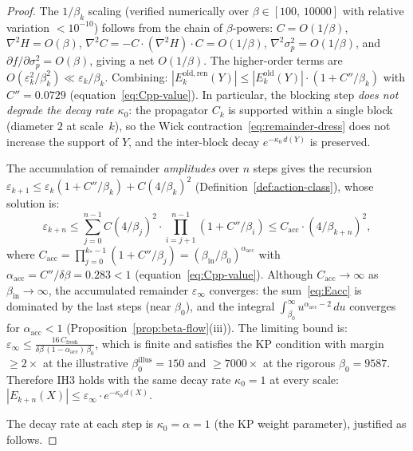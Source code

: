 \documentclass[11pt]{article}
\theoremstyle{definition}
\begin{document}
\begin{proof}
The $1/\beta_k$ scaling (verified numerically over
$\beta\in[100,\,10000]$ with relative variation $<10^{-10}$)
follows from the chain of
$\beta$-powers: $C=O(1/\beta)$, $\nabla^2 H=O(\beta)$,
$\nabla^2 C = -C\cdot(\nabla^2 H)\cdot C=O(1/\beta)$,
$\nabla^2\sigma_p^2=O(1/\beta)$, and $\partial f/\partial\sigma_p^2
=O(\beta)$, giving a net $O(1/\beta)$.
The higher-order terms are $O(\varepsilon_k^2/\beta_k^2)\ll
\varepsilon_k/\beta_k$.  Combining:
$|E_k^{\mathrm{old,ren}}(Y)|\le|E_k^{\mathrm{old}}(Y)|
\cdot(1+C''/\beta_k)$
with $C''=0.0729$
(equation~\eqref{eq:Cpp-value}).
In particular, the blocking step \emph{does not degrade the
decay rate $\kappa_0$}: the propagator $C_k$ is supported
within a single block (diameter $2$ at scale~$k$), so the
Wick contraction~\eqref{eq:remainder-dress} does not increase
the support of $Y$, and the inter-block decay
$e^{-\kappa_0\,d(Y)}$ is preserved.

The accumulation of remainder \emph{amplitudes} over $n$ steps
gives the recursion
$\varepsilon_{k+1}\le\varepsilon_k(1+C''/\beta_k)+C(4/\beta_k)^2$
(Definition~\ref{def:action-class}),
whose solution is:
\begin{equation}\label{eq:Eacc}
\varepsilon_{k+n}
\le\sum_{j=0}^{n-1}
C(4/\beta_j)^2\cdot\prod_{i=j+1}^{n-1}(1+C''/\beta_i)
\le C_{\mathrm{acc}}\cdot(4/\beta_{k+n})^2,
\end{equation}
where $C_{\mathrm{acc}}=\prod_{j=0}^{k_*-1}(1+C''/\beta_j)
=(\beta_{\mathrm{in}}/\beta_0)^{\alpha_{\mathrm{acc}}}$ with
$\alpha_{\mathrm{acc}}=C''/\delta\beta=0.283<1$
(equation~\eqref{eq:Cpp-value}).
Although $C_{\mathrm{acc}}\to\infty$ as $\beta_{\mathrm{in}}\to\infty$,
the accumulated remainder $\varepsilon_\infty$ converges:
the sum~\eqref{eq:Eacc} is dominated by the last steps
(near $\beta_0$), and the integral
$\int_{\beta_0}^\infty u^{\alpha_{\mathrm{acc}}-2}\,du$
converges for $\alpha_{\mathrm{acc}}<1$
(Proposition~\ref{prop:beta-flow}(iii)).
The limiting bound is:
$\varepsilon_\infty
\le\frac{16\,C_{\mathrm{fresh}}}
{\delta\beta\,(1-\alpha_{\mathrm{acc}})\,\beta_0}$,
which is finite and satisfies the KP condition with margin
$\ge 2\times$ at the illustrative $\beta_0^{\mathrm{illus}}=150$ and $\ge 7000\times$ at the rigorous $\beta_0=9587$.
Therefore IH3 holds with the same decay rate
$\kappa_0=1$ at every scale:
$|E_{k+n}(X)|\le\varepsilon_\infty
\cdot e^{-\kappa_0\,d(X)}$.

The decay rate at each step is
$\kappa_0=\alpha=1$ (the KP weight parameter), justified as follows.


\end{proof}
\end{document}
